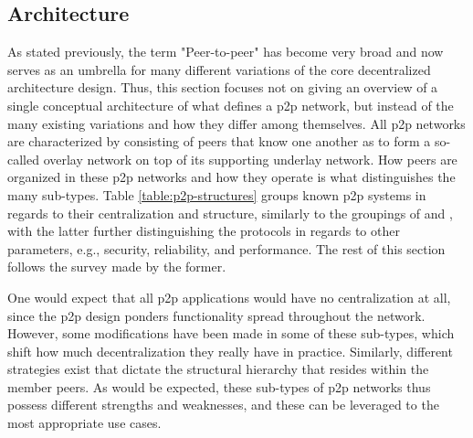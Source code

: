 \subsection{Architecture}

    As stated previously, the term "Peer-to-peer" has become very broad and now serves as an umbrella for many different variations of the core decentralized architecture design.
    Thus, this section focuses not on giving an overview of a single conceptual architecture of what defines a \gls{p2p} network, but instead of the many existing variations and how they differ among themselves.
    All \gls{p2p} networks are characterized by consisting of peers that know one another as to form a so-called overlay network on top of its supporting underlay network.
    How peers are organized in these \gls{p2p} networks and how they operate is what distinguishes the many sub-types.
    Table \ref{table:p2p-structures} groups known \gls{p2p} systems in regards to their centralization and structure, similarly to the groupings of \cite{p2p-survey-1} and \cite{p2p-survey-2}, with the latter further distinguishing the protocols in regards to other parameters, e.g., security, reliability, and performance.
    The rest of this section follows the survey made by the former.

    One would expect that all \gls{p2p} applications would have no centralization at all, since the \gls{p2p} design ponders functionality spread throughout the network.
    However, some modifications have been made in some of these sub-types, which shift how much decentralization they really have in practice.
    Similarly, different strategies exist that dictate the structural hierarchy that resides within the member peers.
    As would be expected, these sub-types of \gls{p2p} networks thus possess different strengths and weaknesses, and these can be leveraged to the most appropriate use cases.

